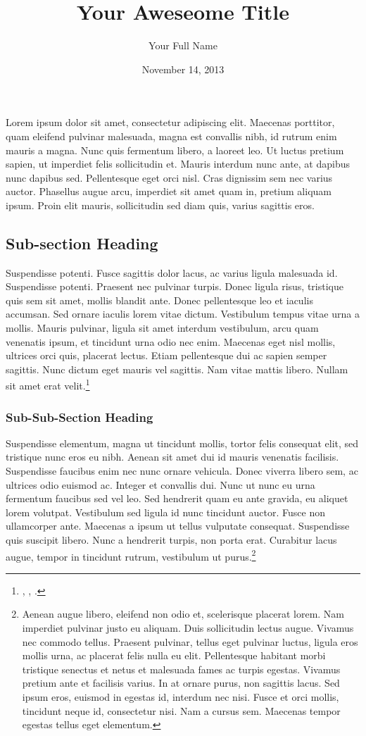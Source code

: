 \documentclass{sblhs-essay}
\author{Your Full Name}
\date{November 14, 2013}
\title{Your Aweseome Title}
\begin{document}
	\maketitle

Lorem ipsum dolor sit amet, consectetur adipiscing elit. Maecenas porttitor, quam eleifend pulvinar malesuada, magna est convallis nibh, id rutrum enim mauris a magna. Nunc quis fermentum libero, a laoreet leo. Ut luctus pretium sapien, ut imperdiet felis sollicitudin et. Mauris interdum nunc ante, at dapibus nunc dapibus sed. Pellentesque eget orci nisl. Cras dignissim sem nec varius auctor. Phasellus augue arcu, imperdiet sit amet quam in, pretium aliquam ipsum. Proin elit mauris, sollicitudin sed diam quis, varius sagittis eros.

\subsection*{Sub-section Heading}
Suspendisse potenti. Fusce sagittis dolor lacus, ac varius ligula malesuada id.\autocite{cross:1973a} Suspendisse potenti. Praesent nec pulvinar turpis. Donec ligula risus, tristique quis sem sit amet, mollis blandit ante. Donec pellentesque leo et iaculis accumsan. Sed ornare iaculis lorem vitae dictum. Vestibulum tempus vitae urna a mollis.\autocite{ulrich:2001} Mauris pulvinar, ligula sit amet interdum vestibulum, arcu quam venenatis ipsum, et tincidunt urna odio nec enim. Maecenas eget nisl mollis, ultrices orci quis, placerat lectus. Etiam pellentesque dui ac sapien semper sagittis. Nunc dictum eget mauris vel sagittis. Nam vitae mattis libero. Nullam sit amet erat velit.\footnote{\autocite{bartlett:1969}, \autocite{bartlett:1972}, \autocite{bartlett:1977}.}

\subsubsection{Sub-Sub-Section Heading}
Suspendisse elementum, magna ut tincidunt mollis, tortor felis consequat elit, sed tristique nunc eros eu nibh. Aenean sit amet dui id mauris venenatis facilisis. Suspendisse faucibus enim nec nunc ornare vehicula. Donec viverra libero sem, ac ultrices odio euismod ac. Integer et convallis dui. Nunc ut nunc eu urna fermentum faucibus sed vel leo. Sed hendrerit quam eu ante gravida, eu aliquet lorem volutpat. Vestibulum sed ligula id nunc tincidunt auctor. Fusce non ullamcorper ante. Maecenas a ipsum ut tellus vulputate consequat. Suspendisse quis suscipit libero. Nunc a hendrerit turpis, non porta erat. Curabitur lacus augue, tempor in tincidunt rutrum, vestibulum ut purus.\footnote{Aenean augue libero, eleifend non odio et, scelerisque placerat lorem. Nam imperdiet pulvinar justo eu aliquam. Duis sollicitudin lectus augue. Vivamus nec commodo tellus. Praesent pulvinar, tellus eget pulvinar luctus, ligula eros mollis urna, ac placerat felis nulla eu elit. Pellentesque habitant morbi tristique senectus et netus et malesuada fames ac turpis egestas. Vivamus pretium ante et facilisis varius. In at ornare purus, non sagittis lacus. Sed ipsum eros, euismod in egestas id, interdum nec nisi. Fusce et orci mollis, tincidunt neque id, consectetur nisi. Nam a cursus sem. Maecenas tempor egestas tellus eget elementum.}
\end{document}
